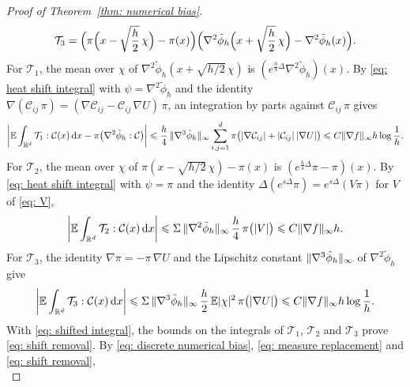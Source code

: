 \begin{proof}[Proof of Theorem~\ref{thm: numerical bias}]
\begin{equation*}
\begin{gathered}
        \mathcal T_3 = \Bigl( \pi\Bigl( x - \sqrt{\frac h2}\, \chi \Bigr) - \pi(x) \Bigr) \Bigl( \nabla^2 \tilde\phi_h\Bigl( x + \sqrt{\frac h2}\, \chi \Bigr) - \nabla^2 \tilde\phi_h(x) \Bigr) .
    \end{gathered}
    \end{equation*}
    For $\mathcal T_1$, the mean over $\chi$ of $\nabla^2 \tilde\phi_h( x + \sqrt{h/2}\, \chi )$ is $( e^{\frac h4 \Delta} \nabla^2 \tilde\phi_h )(x)$. By \eqref{eq: heat shift integral} with $\psi = \nabla^2 \tilde\phi_h$ and the identity $\nabla ( \mathcal C_{ij}\, \pi ) = ( \nabla \mathcal C_{ij} - \mathcal C_{ij}\, \nabla U )\, \pi$, an integration by parts against $\mathcal C_{ij}\, \pi$ gives
    \begin{equation*}
        \biggl| \mathbb E \int_{\mathbb R^d} \mathcal T_1 : \mathcal C(x)\, \mathrm{d} x - \pi\bigl( \nabla^2 \tilde\phi_h : \mathcal C \bigr) \biggr| \leqslant \frac h4\, \lVert \nabla^3 \tilde\phi_h \rVert_\infty \sum_{i,j=1}^{d} \pi\bigl( |\nabla \mathcal C_{ij}| + |\mathcal C_{ij}|\, |\nabla U| \bigr) \leqslant C \lVert \nabla f \rVert_\infty h \log\frac1h .
    \end{equation*}
    For $\mathcal T_2$, the mean over $\chi$ of $\pi( x - \sqrt{h/2}\, \chi ) - \pi(x)$ is $( e^{\frac h4 \Delta} \pi - \pi )(x)$. By \eqref{eq: heat shift integral} with $\psi = \pi$ and the identity $\Delta ( e^{s\Delta} \pi ) = e^{s\Delta} ( V \pi )$ for $V$ of \eqref{eq: V},
    \begin{equation*}
        \biggl| \mathbb E \int_{\mathbb R^d} \mathcal T_2 : \mathcal C(x)\, \mathrm{d} x \biggr| \leqslant \Sigma\, \lVert \nabla^2 \tilde\phi_h \rVert_\infty\, \frac h4\, \pi\bigl( |V| \bigr) \leqslant C \lVert \nabla f \rVert_\infty h .
    \end{equation*}
    For $\mathcal T_3$, the identity $\nabla \pi = -\pi\, \nabla U$ and the Lipschitz constant $\lVert \nabla^3 \tilde\phi_h \rVert_\infty$ of $\nabla^2 \tilde\phi_h$ give
    \begin{equation*}
        \biggl| \mathbb E \int_{\mathbb R^d} \mathcal T_3 : \mathcal C(x)\, \mathrm{d} x \biggr| \leqslant \Sigma\, \lVert \nabla^3 \tilde\phi_h \rVert_\infty\, \frac h2\, \mathbb E |\chi|^2\, \pi\bigl( |\nabla U| \bigr) \leqslant C \lVert \nabla f \rVert_\infty h \log\frac1h .
    \end{equation*}
    With \eqref{eq: shifted integral}, the bounds on the integrals of $\mathcal T_1$, $\mathcal T_2$ and $\mathcal T_3$ prove \eqref{eq: shift removal}. By \eqref{eq: discrete numerical bias}, \eqref{eq: measure replacement} and \eqref{eq: shift removal},
    \begin{equation}

\end{equation}
\end{proof}

